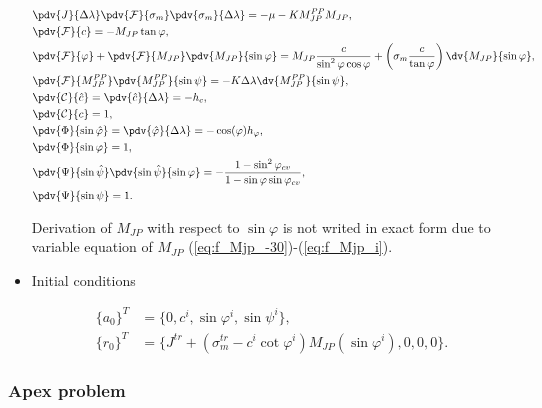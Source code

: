 \begin{itemize}
	\begin{align}
		&\pdv{J}{\Delta \lambda} \pdv{\mathcal{F}}{\sigma_m} \pdv{\sigma_m}{\Delta \lambda}  = -\mu - K M_{JP}^{PP}M_{JP},\\
		&\pdv{\mathcal{F}}{c} = -M_{JP}\tan\varphi,\\
		&\pdv{\mathcal{F}}{\varphi} + \pdv{\mathcal{F}}{M_{JP}} \pdv{M_{JP}}{\sin \varphi} = M_{JP} \dfrac{c}{\sin^2\varphi \cos\varphi} + \left( \sigma_m \dfrac{c}{\tan \varphi} \right) \dv{M_{JP}}{\sin \varphi}, \\
		&\pdv{\mathcal{F}}{M_{JP}^{PP}} \pdv{M_{JP}^{PP}}{\sin \psi} = -K \Delta \lambda \dv{M_{JP}^{PP}}{\sin \psi},\\
		&\pdv{\mathcal{C}}{\hat{c}} = \pdv{\hat{c}}{\Delta \lambda} = -h_c, \\
		&\pdv{\mathcal{C}}{c} = 1,\\
		&\pdv{\mathrm{\Phi}}{\sin \hat{\varphi}} = \pdv{\hat{\varphi}}{\Delta \lambda} = -\cos(\varphi) h_{\varphi},\\
		&\pdv{\mathrm{\Phi}}{\sin \varphi} = 1,\\
		&\pdv{\mathrm{\Psi}}{\sin \hat{\psi}} \pdv{\sin \hat{\psi}}{\sin \varphi} = -\dfrac{1 - \sin^2\varphi_{cv} }{1-\sin \varphi \sin \varphi_{cv}},\\
		&\pdv{\mathrm{\Psi}}{\sin \psi} = 1.
	\end{align}
	
	Derivation of $M_{JP}$ with respect to $\sin \varphi$ is not writed in exact form due to variable equation of $M_{JP}$ (\ref{eq:f_Mjp_-30})-(\ref{eq:f_Mjp_i}).
	
	\item Initial conditions
	
	\begin{align}
		\lbrace a_0 \rbrace^T &= \lbrace 0, c^i, \sin \varphi^i, \sin \psi^i \rbrace,\\
		\lbrace r_0 \rbrace^T &= \lbrace J^{tr} + (\sigma_m^{tr}-c^i\cot\varphi^i)M_{JP}(\sin\varphi^i), 0, 0, 0 \rbrace.
	\end{align}
	
\end{itemize} 

\subsubsection{Apex problem}
\indent

